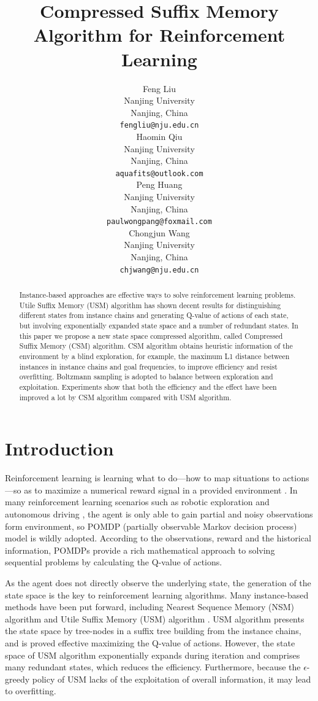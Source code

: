 \documentclass{article}
\title{Compressed Suffix Memory Algorithm for Reinforcement Learning%
}
\author{%
  Feng Liu\\ 
  Nanjing University\\ 
  Nanjing, China \\
  \texttt{fengliu@nju.edu.cn} \\
  \And
  Haomin Qiu \\
  Nanjing University\\ 
  Nanjing, China \\
  \texttt{aquafits@outlook.com} \\
  \And
  Peng Huang \\
  Nanjing University\\ 
  Nanjing, China \\
  \texttt{paulwongpang@foxmail.com} \\
  \And
  Chongjun Wang \\
  Nanjing University\\ 
  Nanjing, China \\
  \texttt{chjwang@nju.edu.cn} \\
}
\begin{document}
\maketitle 

\begin{abstract}
  Instance-based approaches are effective ways to solve reinforcement learning problems.
  Utile Suffix Memory (USM) algorithm has shown decent results for distinguishing different
  states from instance chains and generating Q-value of actions of each state, but involving
  exponentially expanded state space and a number of redundant states. In this paper we
  propose a new state space compressed algorithm, called Compressed Suffix Memory (CSM)
  algorithm. CSM algorithm obtains heuristic information of the environment by a blind
  exploration, for example, the maximum L1 distance between instances in instance chains
  and goal frequencies, to improve efficiency and resist overfitting. Boltzmann sampling
  is adopted to balance between exploration and exploitation. Experiments show that both
  the efficiency and the effect have been improved a lot by CSM algorithm compared with
  USM algorithm.
\end{abstract}

\section{Introduction}

Reinforcement learning is learning what to do—how to map situations to actions—so
as to maximize a numerical reward signal in a provided environment
\cite{sutton2018reinforcement}. In many reinforcement learning scenarios such as
robotic exploration \cite{smith2007probabilistic} and autonomous driving
\cite{bai2015intention}, the agent is only able to gain partial and noisy
observations form environment, so POMDP (partially observable Markov decision
process) model is wildly adopted. According to the observations, reward and the
historical information, POMDPs provide a rich mathematical approach to solving
sequential problems by calculating the Q-value of actions.

As the agent does not directly observe the underlying state, the generation of
the state space is the key to reinforcement learning algorithms.
Many instance-based methods have been put forward, including Nearest Sequence
Memory (NSM) algorithm \cite{mccallum1997reinforcement} and Utile Suffix Memory
(USM) algorithm \cite{mccallum1995instance}. USM algorithm presents the state space by
tree-nodes in a suffix tree building from the instance chains, and is proved
effective maximizing the Q-value of actions. However, the state space of USM
algorithm exponentially expands during iteration and comprises many redundant
states, which reduces the efficiency. Furthermore, because the $\epsilon$-greedy
policy of USM lacks of the exploitation of overall information, it may lead to
overfitting.
\end{document}
